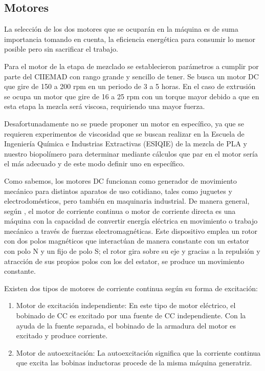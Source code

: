 \documentclass[14pt,oneside]{extarticle} %
\begin{document}
\subsection{Motores}

La selección de los dos motores que se ocuparán en la máquina es de suma importancia tomando en cuenta, la eficiencia energética para consumir lo menor posible pero sin sacrificar el trabajo.

Para el motor de la etapa de mezclado se establecieron parámetros a cumplir por parte del CIIEMAD con rango grande y sencillo de tener. Se busca un motor DC que gire de 150 a 200 rpm en un periodo de 3 a 5 horas. En el caso de extrusión se ocupa un motor que gire de 16 a 25 rpm con un torque mayor debido a que en esta etapa la mezcla será viscosa, requiriendo una mayor fuerza. 

Desafortunadamente no se puede proponer un motor en específico, ya que se requieren experimentos de viscosidad que se buscan realizar en la Escuela de Ingeniería Química e Industrias Extractivas (ESIQIE) de la mezcla de PLA y nuestro biopolímero para determinar mediante cálculos que par en el motor sería el más adecuado y de este modo definir uno en específico.

Como sabemos, los motores DC funcionan como generador de movimiento mecánico para distintos aparatos de uso cotidiano, tales como juguetes y electrodomésticos, pero también en maquinaria industrial. De manera general, según \cite{motoresDC}, el motor de corriente continua o motor de corriente directa es una máquina con la capacidad de convertir energía eléctrica en movimiento o trabajo mecánico a través de fuerzas electromagnéticas. Este dispositivo emplea un rotor con dos polos magnéticos que interactúan de manera constante con un estator con polo N y un fijo de polo S; el rotor gira sobre su eje y gracias a la repulsión y atracción de sus propios polos con los del estator, se produce un movimiento constante.

Existen dos tipos de motores de corriente continua según su forma de excitación: 
\begin{enumerate}
    \item Motor de excitación independiente: En este tipo de motor eléctrico, el bobinado de CC es excitado por una fuente de CC independiente. Con la ayuda de la fuente separada, el bobinado de la armadura del motor es excitado y produce corriente.
    \item Motor de autoexcitación: La autoexcitación significa que la corriente continua que excita las bobinas inductoras procede de la misma máquina generatriz. 
\end{enumerate}
\end{document}
